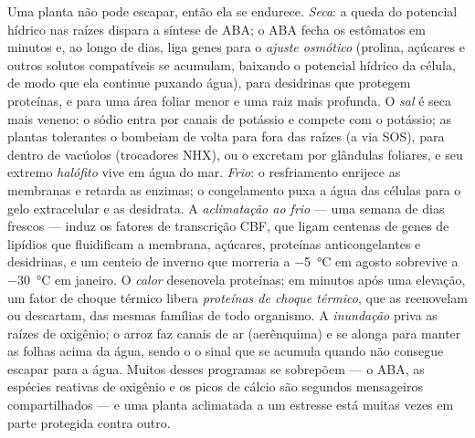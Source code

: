 \begin{definition}\label{def:b3:plant-molecular-physiology:abiotic}
Uma planta não pode escapar, então ela se endurece. \emph{Seca}: a queda
do potencial hídrico nas raízes dispara a síntese de ABA; o ABA fecha os
estômatos em minutos e, ao longo de dias, liga genes para o \emph{ajuste
osmótico} (prolina, açúcares e outros solutos compatíveis se acumulam,
baixando o potencial hídrico da célula, de modo que ela continue puxando
água), para desidrinas que protegem proteínas, e para uma área foliar
menor e uma raiz mais profunda. O \emph{sal} é seca mais veneno: o sódio
entra por canais de potássio e compete com o potássio; as plantas
tolerantes o bombeiam de volta para fora das raízes (a via SOS), para
dentro de vacúolos (trocadores NHX), ou o excretam por glândulas
foliares, e seu extremo \emph{halófito} vive em água do mar. \emph{Frio}:
o resfriamento enrijece as membranas e retarda as enzimas; o congelamento
puxa a água das células para o gelo extracelular e as desidrata. A
\emph{aclimatação ao frio} --- uma semana de dias frescos --- induz os
fatores de transcrição CBF, que ligam centenas de genes de lipídios que
fluidificam a membrana, açúcares, proteínas anticongelantes e
desidrinas, e um centeio de inverno que morreria a \qty{-5}{\celsius} em
agosto sobrevive a \qty{-30}{\celsius} em janeiro. O \emph{calor}
desenovela proteínas; em minutos após uma elevação, um fator de choque
térmico libera \emph{proteínas de choque térmico},  que as
reenovelam ou descartam, das mesmas famílias de todo organismo. A
\emph{inundação} priva as raízes de oxigênio; o arroz faz canais de ar
(aerênquima) e se alonga para manter as folhas acima da água, sendo o
 o sinal que se acumula quando não consegue escapar para a água.
Muitos desses programas se sobrepõem --- o ABA, as espécies reativas de
oxigênio e os picos de cálcio são segundos mensageiros compartilhados ---
e uma planta aclimatada a um estresse está muitas vezes em parte
protegida contra outro.
\end{definition}

